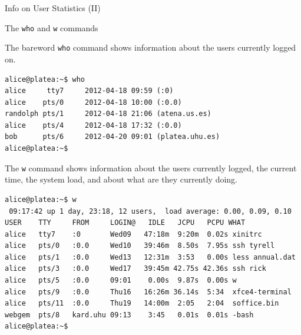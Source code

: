 \begin{frame}[t,fragile]{Info on User Statistics (II)}

  \vspace{-0.2cm}
  \begin{block}{The \alert{\texttt{who}} and \alert{\texttt{w}} commands}
    {\footnotesize
   The bareword \alert{\texttt{who}} command shows information about the users currently logged on.
   
   {\tiny
      \begin{lstlisting}
alice@platea:~$ who
alice     tty7     2012-04-18 09:59 (:0)
alice    pts/0     2012-04-18 10:00 (:0.0)
randolph pts/1     2012-04-18 21:06 (atena.us.es)
alice    pts/4     2012-04-18 17:32 (:0.0)
bob      pts/6     2012-04-20 09:01 (platea.uhu.es)
alice@platea:~$
      \end{lstlisting}
 }
   The \alert{\texttt{w}} command      shows information about the users currently logged, the current
    time, the system load, and about what are they currently doing.


   {\tiny
      \begin{lstlisting}
alice@platea:~$ w
 09:17:42 up 1 day, 23:18, 12 users,  load average: 0.00, 0.09, 0.10
USER    TTY     FROM     LOGIN@   IDLE   JCPU   PCPU WHAT
alice   tty7    :0       Wed09   47:18m  9:20m  0.02s xinitrc 
alice   pts/0   :0.0     Wed10   39:46m  8.50s  7.95s ssh tyrell
alice   pts/1   :0.0     Wed13   12:31m  3:53   0.00s less annual.dat
alice   pts/3   :0.0     Wed17   39:45m 42.75s 42.36s ssh rick
alice   pts/5   :0.0     09:01    0.00s  9.87s  0.00s w
alice   pts/9   :0.0     Thu16   16:26m 36.14s  5:34  xfce4-terminal
alice   pts/11  :0.0     Thu19   14:00m  2:05   2:04  soffice.bin
webgem  pts/8   kard.uhu 09:13    3:45   0.01s  0.01s -bash
alice@platea:~$ 
      \end{lstlisting}
    } 
}
  \end{block}
  
\end{frame}
